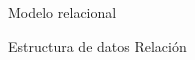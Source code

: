 \begin{frame}{Modelo relacional}
    \vspace{5mm}
    \begin{overlayarea}{\linewidth}{\textheight}
        \begin{block}{Estructura de datos}
           Relaci\'on
        \end{block}
    \end{overlayarea}
\end{frame}






    






